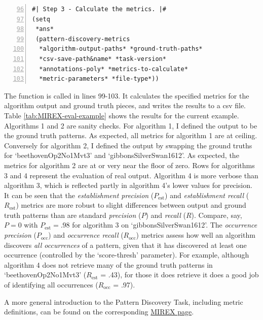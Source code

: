 \begin{Verbatim}[frame=single,numbers=left,firstnumber=96]
#| Step 3 - Calculate the metrics. |#
(setq
 *ans*
 (pattern-discovery-metrics
  *algorithm-output-paths* *ground-truth-paths*
  *csv-save-path&name* *task-version*
  *annotations-poly* *metrics-to-calculate*
  *metric-parameters* *file-type*))
\end{Verbatim}
The function  is called in lines 99-103. It calculates the specified metrics for the algorithm output and ground truth pieces, and writes the results to a csv file. Table \ref{tab:MIREX-eval-example} shows the results for the current example. Algorithms 1 and 2 are sanity checks. For algorithm 1, I defined the output to be the ground truth patterns. As expected, all metrics for algorithm 1 are at ceiling. Conversely for algorithm 2, I defined the output by swapping the ground truths for `beethovenOp2No1Mvt3' and `gibbonsSilverSwan1612'. As expected, the metrics for algorithm 2 are at or very near the floor of zero. Rows for algorithms 3 and 4 represent the evaluation of real output. Algorithm 4 is more verbose than algorithm 3, which is reflected partly in algorithm 4's lower values for precision. It can be seen that the \emph{establishment precision} ($P_\text{est}$) and \emph{establishment recall} ($R_\text{est}$) metrics are more robust to slight differences between output and ground truth patterns than are standard \emph{precision} ($P$) and \emph{recall} ($R$). Compare, say, $P = 0$ with $P_\text{est} = .98$ for algorithm 3 on `gibbonsSilverSwan1612'. The \emph{occurrence precision} ($P_\text{occ}$) and \emph{occurrence recall} ($R_\text{occ}$) metrics assess how well an algorithm discovers \emph{all occurrences} of a pattern, given that it has discovered at least one occurrence (controlled by the `score-thresh' parameter). For example, although algorithm 4 does not retrieve many of the ground truth patterns in `beethovenOp2No1Mvt3' ($R_\text{est}$ = .43), for those it does retrieve it does a good job of identifying all occurrences ($R_\text{occ}$ = .97).

A more general introduction to the Pattern Discovery Task, including metric definitions, can be found on the corresponding \href{http://www.music-ir.org/mirex/wiki/MIREX_HOME}{MIREX page}.























